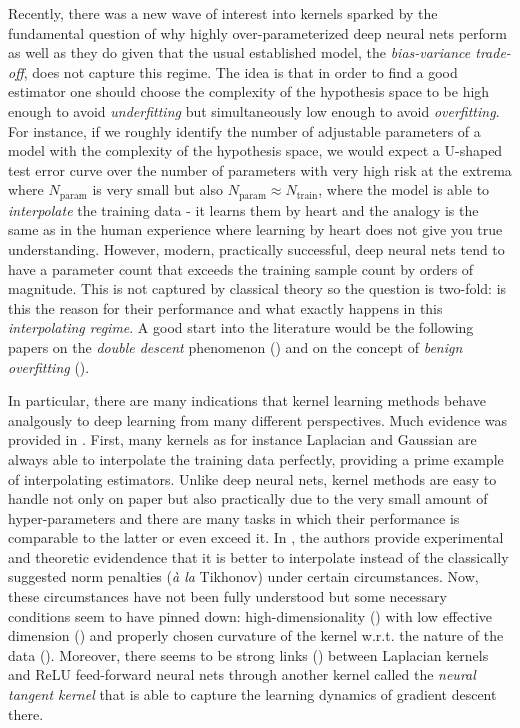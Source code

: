 \documentclass[12pt]{amsart}
\begin{document}
Recently, there was a new wave of interest into kernels sparked by the 
fundamental question of why highly over-parameterized deep neural nets
perform as well as they do given that the usual established model, 
the \emph{bias-variance trade-off}, does not capture this regime.
The idea is that in order to find a good estimator one should choose 
the complexity of the hypothesis space to be high enough to avoid 
\emph{underfitting} but simultaneously low enough to avoid 
\emph{overfitting}.
For instance, if we roughly identify the number of adjustable parameters
of a model with the complexity of the hypothesis space, we would expect
a U-shaped test error curve over the number of parameters with very high
risk at the extrema where $N_{\textrm{param}}$ is very small but also
$N_{\textrm{param}} \approx N_{\textrm{train}}$, where the model is able
to \emph{interpolate} the training data - it learns them by heart and 
the analogy is the same as in the human experience where learning by heart
does not give you true understanding.
However, modern, practically successful, deep neural nets tend to have a
parameter count that exceeds the training sample count by orders of 
magnitude.
This is not captured by classical theory so the question is two-fold:
is this the reason for their performance and 
what exactly happens in this \emph{interpolating regime}.
A good start into the literature would be the following papers on 
the \emph{double descent} phenomenon (\cite{doubledescent}) and on the
concept of \emph{benign overfitting} (\cite{benignoverfitting}).

In particular, there are many indications that kernel learning methods 
behave analgously to deep learning from many different perspectives.
Much evidence was provided in \cite{understandkernels}.
First, many kernels as for instance Laplacian and Gaussian are always 
able to interpolate the training data perfectly, providing a prime example
of interpolating estimators.
Unlike deep neural nets, kernel methods are easy to handle not only on 
paper but also practically due to the very small amount of hyper-parameters
and there are many tasks in which their performance is comparable to the 
latter or even exceed it.
In \cite{justinterpolate}, the authors provide experimental and theoretic 
evidendence that it is better to interpolate instead of the classically 
suggested norm penalties (\textit{à la} Tikhonov) under certain circumstances.
Now, these circumstances have not been fully understood but some necessary 
conditions seem to have pinned down:
high-dimensionality (\cite{laplaceconsistency,benignoverfitting}) 
with low effective dimension (\cite{benignoverfitting})
and properly chosen curvature of the kernel w.r.t. the nature of the data 
(\cite{justinterpolate}).
Moreover, there seems to be strong links (\cite{ntklaplacian}) between 
Laplacian kernels and ReLU feed-forward neural nets through another kernel 
called the \emph{neural tangent kernel} that is able to capture the 
learning dynamics of gradient descent there.
\end{document}
